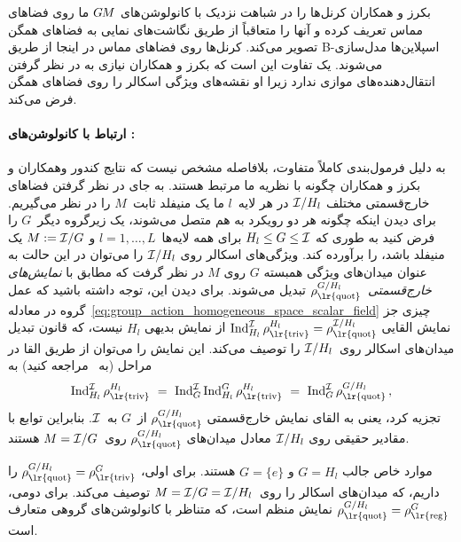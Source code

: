 بکرز و همکاران\cite{bekkers2020bspline} کرنل‌ها را در شباهت نزدیک با کانولوشن‌های $G\mkern-1.4muM$ ما روی فضاهای مماس تعریف کرده و آنها را متعاقباً از طریق نگاشت‌های نمایی به فضاهای همگن تصویر می‌کند.
کرنل‌ها روی فضاهای مماس در اینجا از طریق B-اسپلاین‌ها مدل‌سازی می‌شوند.
یک تفاوت این است که بکرز و همکاران\cite{bekkers2020bspline} نیازی به در نظر گرفتن انتقال‌دهنده‌های موازی ندارد زیرا او نقشه‌های ویژگی اسکالر را روی فضاهای همگن فرض می‌کند.





\paragraph{ارتباط با کانولوشن‌های \emph{}:}

به دلیل فرمول‌بندی کاملاً متفاوت، بلافاصله مشخص نیست که نتایج کندور وهمکاران \cite{Kondor2018-GENERAL} و بکرز و همکاران\cite{bekkers2020bspline} چگونه با نظریه ما مرتبط هستند.
به جای در نظر گرفتن فضاهای خارج‌قسمتی مختلف $\mathcal{I}/H_l$ در هر لایه~$l$ ما یک منیفلد ثابت~$M$ را در نظر می‌گیریم.
برای دیدن اینکه چگونه هر دو رویکرد به هم متصل می‌شوند، یک زیرگروه دیگر~$G$ را فرض کنید به طوری که $H_l \leq G \leq \mathcal{I}$ برای همه لایه‌ها~$l=1,\dots,L$ و $M := \mathcal{I}/G$ یک منیفلد باشد، را برآورده کند.
ویژگی‌های اسکالر روی $\mathcal{I}/H_l$ را می‌توان در این حالت به عنوان میدان‌های ویژگی همبسته $G$ روی $M$ در نظر گرفت که مطابق با \emph{نمایش‌های خارج‌قسمتی}~$\rho_\textup{\lr{quot}}^{G/H_l}$ تبدیل می‌شوند.
برای دیدن این، توجه داشته باشید که عمل گروه در معادله~\eqref{eq:group_action_homogeneous_space_scalar_field} چیزی جز نمایش القایی $\Ind_{H_l}^{\I} \rho_\textup{\lr{triv}}^{H_l} = \rho_\textup{\lr{quot}}^{\I/H_l}$ از نمایش بدیهی $H_l$ نیست، که قانون تبدیل میدان‌های اسکالر روی~$\mathcal{I}/H_l$ را توصیف می‌کند.
این نمایش را می‌توان از طریق القا در مراحل (به~\cite{ceccherini2009induced} مراجعه کنید) به
\begin{align}
	\Ind_{H_l}^{\I} \rho_\textup{\lr{triv}}^{H_l}
	\ =\ \Ind_G^{\I} \Ind_{H_l}^G \rho_\textup{\lr{triv}}^{H_l}
	\ =\ \Ind_G^{\I} \rho_\textup{\lr{quot}}^{G/H_l} \,,
\end{align}
تجزیه کرد، یعنی به القای نمایش خارج‌قسمتی $\rho_\textup{\lr{quot}}^{G/H_l}$ از~$G$ به~$\mathcal{I}$.
بنابراین توابع با مقادیر حقیقی روی $\mathcal{I}/H_l$ معادل میدان‌های $\rho_\textup{\lr{quot}}^{G/H_l}$ روی~$M=\mathcal{I}/G$ هستند.


موارد خاص جالب $G=H_l$ و $G=\{e\}$ هستند.
برای اولی، $\rho_\textup{\lr{quot}}^{G/H_l} = \rho_\textup{\lr{triv}}^G$ را داریم، که میدان‌های اسکالر را روی~$M = \mathcal{I}/G = \mathcal{I}/H_l$ توصیف می‌کند.
برای دومی، $\rho_\textup{\lr{quot}}^{G/H_l} = \rho_\textup{\lr{reg}}^G$ نمایش منظم است، که متناظر با کانولوشن‌های گروهی متعارف است.


